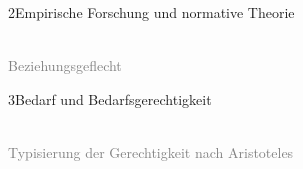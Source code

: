 \documentclass[xcolor=table,9pt,aspectratio=169]{beamer}
\begin{document}
\begin{frame}{\vspace*{10mm}2\hspace*{1em}Empirische Forschung und normative Theorie}
\begin{center}
   \\
   \textcolor{gray}{Beziehungsgeflecht}
\end{center}
\end{frame}


\begin{frame}{\vspace*{10mm}3\hspace*{1em}Bedarf und Bedarfsgerechtigkeit}
\begin{center}
   \\
   \textcolor{gray}{Typisierung der Gerechtigkeit nach Aristoteles}
\end{center}
\end{frame}
\end{document}
